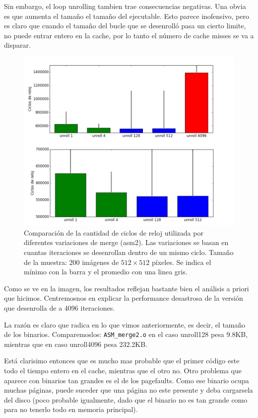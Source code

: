 Sin embargo, el loop unrolling tambien trae consecuencias negativas. Una obvia es que aumenta el tamaño el tamaño del ejecutable. Esto parece inofensivo, pero es claro que cuando el tamaño del bucle que se desenrolló pasa un cierto limite, no puede entrar entero en la cache, por lo tanto el número de cache misses se va a disparar.

\begin{figure}[H] 
	\centering
  \includegraphics[scale=0.7]{merge-unroll.png}
  \caption{Comparación de la cantidad de ciclos de reloj utilizada por diferentes variaciones de merge (asm2). Las variaciones se basan en cuantas iteraciones se desenrollan dentro de un mismo ciclo. Tamaño de la muestra: 200 imágenes de $512 \times 512$ píxeles. Se indica el mínimo con la barra y el promedio con una linea gris.}
\end{figure}

Como se ve en la imagen, los resultados reflejan bastante bien el análisis a priori que hicimos. Centremosnos en explicar la performance desastrosa de la versión que desenrolla de a 4096 iteraciones.

La razón es claro que radica en lo que vimos anteriormente, es decir, el tamaño de los binarios. Comparemoslos: \texttt{ASM\_merge2.o} en el caso unroll128 pesa 9.8KB, mientras que en caso unroll4096 pesa 232.2KB.

Está clarisimo entonces que es mucho mas probable que el primer código este todo el tiempo entero en el cache, mientras que el otro no. Otro problema que aparece con binarios tan grandes es el de los pagefaults. Como ese binario ocupa muchas páginas, puede suceder que una página no este presente y deba cargarsela del disco (poco probable igualmente, dado que el binario no es tan grande como para no tenerlo todo en memoria principal).

